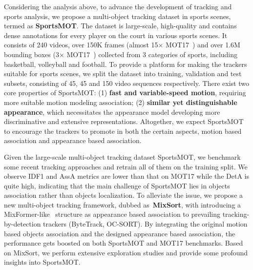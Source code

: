 \documentclass[10pt,twocolumn,letterpaper]{article}
\begin{document}
Considering the analysis above, to advance the development of tracking and sports analysis, we propose a multi-object tracking dataset in sports scenes, termed as \textbf{SportsMOT}. 
The dataset is large-scale, high-quality and contains dense annotations for every player on the court in various sports scenes.
It consists of 240 videos, over 150K frames (almost 15$\times$ MOT17~\cite{milan2016mot16}) and over 1.6M bounding boxes (3$\times$ MOT17~\cite{milan2016mot16}) collected from 3 categories of sports, including basketball, volleyball and football.
To provide a platform for making the trackers suitable for sports scenes, we split the dataset into training, validation and test subsets, consisting of 45, 45 and 150 video sequences respectively.
There exist two core properties of SportsMOT: (1) \textbf{fast and variable-speed motion}, requiring more suitable motion modeling association; (2) \textbf{similar yet distinguishable appearance}, which necessitates the appearance model developing more discriminative and extensive representations.
Altogether, we expect SportsMOT to encourage the trackers to promote in both the certain aspects, \ie motion based association and appearance based association.

Given the large-scale multi-object tracking dataset SportsMOT, we benchmark some recent tracking approaches and retrain all of them on the training split.
We observe IDF1 and AssA metrics are lower than that on MOT17 while the DetA is quite high, indicating that the main challenge of SportsMOT lies in objects association rather than objects localization.
To alleviate the issue, we propose a new multi-object tracking framework, dubbed as~\textbf{MixSort}, with introducing a MixFormer-like~\cite{cui2022mixformer} structure as appearance based association to prevailing tracking-by-detection trackers (\eg ByteTrack\cite{zhang2022bytetrack}, OC-SORT\cite{cao2022observation}).
By integrating the original motion based objects association and the designed appearance based association, the performance gets boosted on both SportsMOT and MOT17 benchmarks. 
Based on MixSort, we perform extensive exploration studies and provide some profound insights into SportsMOT.
\end{document}
